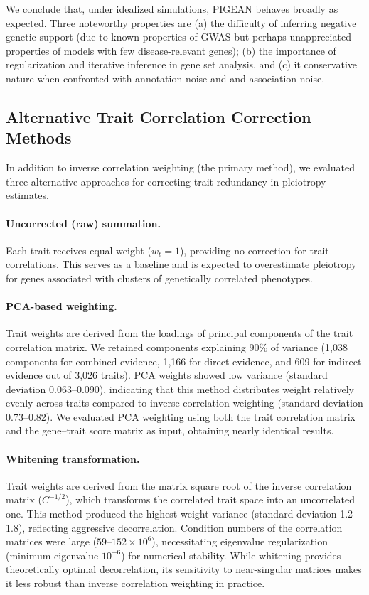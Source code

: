 {We conclude that, under idealized simulations, PIGEAN behaves broadly as expected. Three noteworthy properties are (a) the difficulty of inferring negative genetic support (due to known properties of GWAS but perhaps unappreciated properties of models with few disease-relevant genes); (b) the importance of regularization and iterative inference in gene set analysis, and (c) it conservative nature when confronted with annotation noise and and association noise.

\subsection{Alternative Trait Correlation Correction Methods}

In addition to inverse correlation weighting (the primary method), we evaluated three alternative approaches for correcting trait redundancy in pleiotropy estimates.

\paragraph{Uncorrected (raw) summation.}
Each trait receives equal weight ($w_t = 1$), providing no correction for trait correlations. This serves as a baseline and is expected to overestimate pleiotropy for genes associated with clusters of genetically correlated phenotypes.

\paragraph{PCA-based weighting.}
Trait weights are derived from the loadings of principal components of the trait correlation matrix. We retained components explaining 90\% of variance (1,038 components for combined evidence, 1,166 for direct evidence, and 609 for indirect evidence out of 3,026 traits). PCA weights showed low variance (standard deviation 0.063--0.090), indicating that this method distributes weight relatively evenly across traits compared to inverse correlation weighting (standard deviation 0.73--0.82). We evaluated PCA weighting using both the trait correlation matrix and the gene--trait score matrix as input, obtaining nearly identical results.

\paragraph{Whitening transformation.}
Trait weights are derived from the matrix square root of the inverse correlation matrix ($C^{-1/2}$), which transforms the correlated trait space into an uncorrelated one. This method produced the highest weight variance (standard deviation 1.2--1.8), reflecting aggressive decorrelation. Condition numbers of the correlation matrices were large ($59$--$152 \times 10^{6}$), necessitating eigenvalue regularization (minimum eigenvalue $10^{-6}$) for numerical stability. While whitening provides theoretically optimal decorrelation, its sensitivity to near-singular matrices makes it less robust than inverse correlation weighting in practice.

}
